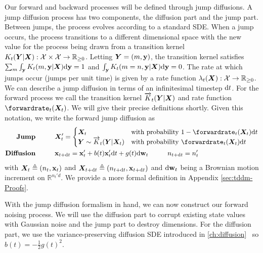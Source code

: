 Our forward and backward processes will be defined through jump diffusions. A jump diffusion process has two components, the diffusion part and the jump part. Between jumps, the process evolves according to a standard SDE. When a jump occurs, the process transitions to a different dimensional space with the new value for the process being drawn from a transition kernel $K_t({\bm{Y}} | {\bm{X}}): {\mathcal{X}} \times {\mathcal{X}} \rightarrow  \mathbb{R}_{\geq 0}$. Letting ${\bm{Y}} = (m, {\mathbf{y}})$, the transition kernel satisfies $\sum_m \int_{\mathbf{y}} K_t(m, {\mathbf{y}} | {\bm{X}}) \mathrm{d} {\mathbf{y}} = 1$ and $\int_{\mathbf{y}} K_t(m=n, {\mathbf{y}} | {\bm{X}}) \mathrm{d} {\mathbf{y}} = 0$. The rate at which jumps occur (jumps per unit time) is given by a rate function $\lambda_t({\bm{X}}): \mathcal{X} \rightarrow \mathbb{R}_{\geq 0}$. 
We can describe a jump diffusion in terms of an infinitesimal timestep $\mathrm{d} t$. For the forward process we call the transition kernel $\overrightarrow{K}_t({\bm{Y}}|{\bm{X}})$ and rate function $\forwardrate_t(\mX_t)$. We will give their precise definitions shortly. Given this notation, we write the forward jump diffusion as
\begin{align}
    \textbf{Jump} \hspace{1cm} & \mX_t' = \begin{cases}
        \mX_t & \text{with probability } 1 - \forwardrate_t(\mX_t) \rmd t \\
        \mY \sim \ftk_t( \mY |\mX_t) & \text{with probability } \forwardrate_t(\mX_t) \rmd t
    \end{cases}  \label{eq:tddm-forward-jump} \\
    \textbf{Diffusion} \hspace{1cm} &\rvx_{t+ \rmd t} = \rvx'_t + b(t)\rvx'_t \rmd t + g(t) \rmd \brown_t \hspace{1cm} n_{t+\rmd t} = n_t'
     \label{eq:tddm-forward-diffusion}
\end{align}
with ${\bm{X}}_t \triangleq (n_t, {\mathbf{x}}_t)$ and ${\bm{X}}_{t+\mathrm{d} t} \triangleq (n_{t+\mathrm{d} t}, {\mathbf{x}}_{t + \mathrm{d} t})$ and $\mathrm{d} \mathbf{w}_t$ being a Brownian motion increment on $\mathbb{R}^{n_t'd}$. We provide a more formal definition in Appendix \ref{sec:tddm-Proofs}.

With the jump diffusion formalism in hand, we can now construct our forward noising process. We will use the diffusion part to corrupt existing state values with Gaussian noise and the jump part to destroy dimensions. For the diffusion part, we use the variance-preserving diffusion SDE introduced in \cref{ch:diffusion}~\cite{ho2020denoising, song2020score} so $b(t) = -\frac{1}{2}g(t)^2$.

